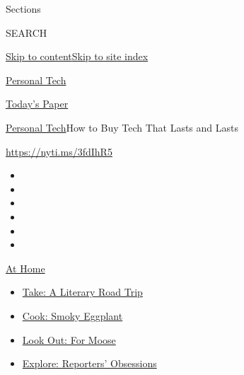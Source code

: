 Sections

SEARCH

\protect\hyperlink{site-content}{Skip to
content}\protect\hyperlink{site-index}{Skip to site index}

\href{https://www.nytimes3xbfgragh.onion/section/technology/personaltech}{Personal
Tech}

\href{https://myaccount.nytimes3xbfgragh.onion/auth/login?response_type=cookie\&client_id=vi}{}

\href{https://www.nytimes3xbfgragh.onion/section/todayspaper}{Today's
Paper}

\href{/section/technology/personaltech}{Personal Tech}\textbar{}How to
Buy Tech That Lasts and Lasts

\href{https://nyti.ms/3fdIhR5}{https://nyti.ms/3fdIhR5}

\begin{itemize}
\item
\item
\item
\item
\item
\item
\end{itemize}

\href{https://www.nytimes3xbfgragh.onion/spotlight/at-home?action=click\&pgtype=Article\&state=default\&region=TOP_BANNER\&context=at_home_menu}{At
Home}

\begin{itemize}
\tightlist
\item
  \href{https://www.nytimes3xbfgragh.onion/2020/07/28/books/time-for-a-literary-road-trip.html?action=click\&pgtype=Article\&state=default\&region=TOP_BANNER\&context=at_home_menu}{Take:
  A Literary Road Trip}
\item
  \href{https://www.nytimes3xbfgragh.onion/2020/07/29/magazine/bored-with-your-home-cooking-some-smoky-eggplant-will-fix-that.html?action=click\&pgtype=Article\&state=default\&region=TOP_BANNER\&context=at_home_menu}{Cook:
  Smoky Eggplant}
\item
  \href{https://www.nytimes3xbfgragh.onion/2020/07/27/travel/moose-michigan-isle-royale.html?action=click\&pgtype=Article\&state=default\&region=TOP_BANNER\&context=at_home_menu}{Look
  Out: For Moose}
\item
  \href{https://www.nytimes3xbfgragh.onion/interactive/2020/at-home/even-more-reporters-editors-diaries-lists-recommendations.html?action=click\&pgtype=Article\&state=default\&region=TOP_BANNER\&context=at_home_menu}{Explore:
  Reporters' Obsessions}
\end{itemize}

